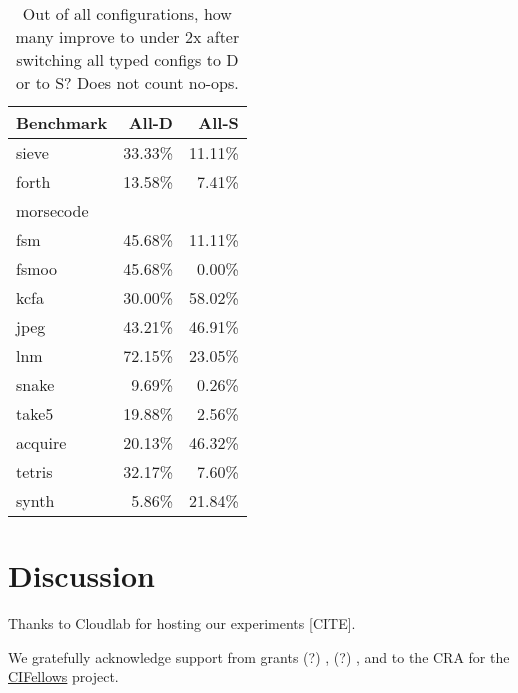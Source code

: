 \documentclass[acmsmall,review,anonymous]{acmart}
\begin{document}
\begin{table}[t]
  \caption{Out of all configurations, how many improve to under 2x after switching all typed configs to D or to S?
  Does not count no-ops.}
  \label{t:micros}
  \begin{tabular}{lrr}
    Benchmark & All-D & All-S \\\midrule
    sieve & 33.33\% & 11.11\% \\
    forth & 13.58\% & 7.41\% \\
    morsecode & & \\
    fsm & 45.68\% & 11.11\% \\
    fsmoo & 45.68\% & 0.00\% \\
    kcfa & 30.00\% & 58.02\% \\
    jpeg & 43.21\% & 46.91\% \\
    lnm & 72.15\% & 23.05\% \\
    snake & 9.69\% & 0.26\% \\
    take5 & 19.88\% & 2.56\% \\
    acquire & 20.13\% & 46.32\% \\
    tetris & 32.17\% & 7.60\% \\
    synth & 5.86\% & 21.84\% \\
  \end{tabular}

\end{table}



\section{Discussion}
\label{s:conclusion}
\label{s:discussion}



\begin{acks}
  Thanks to Cloudlab for hosting our experiments [CITE].

We gratefully acknowledge support from
 grants
  (?) \href{"https://www.nsf.gov/awardsearch/showAward?AWD_ID=1763922"}{},
  (?) \href{"https://www.nsf.gov/awardsearch/showAward?AWD_ID=1823244"}{},
 and
 \href{"https://www.nsf.gov/awardsearch/showAward?AWD_ID=2030859"}{}
  to the CRA for the \href{https://cifellows2020.org}{CIFellows} project.
\end{acks}



\end{document}
